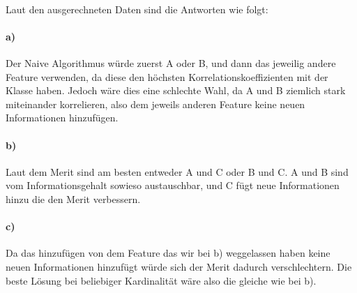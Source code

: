 \documentclass{article}
\begin{document}
\paragraph{}
Laut den ausgerechneten Daten sind die Antworten wie folgt: 
\paragraph{a)}
Der Naive Algorithmus würde zuerst A oder B, und dann das jeweilig andere Feature verwenden, da diese den höchsten Korrelationskoeffizienten mit der Klasse haben. Jedoch wäre dies eine schlechte Wahl, da A und B ziemlich stark miteinander korrelieren, also dem jeweils anderen Feature keine neuen Informationen hinzufügen.
\paragraph{b)}
Laut dem Merit sind am besten entweder A und C oder B und C. A und B sind vom Informationsgehalt sowieso austauschbar, und C fügt neue Informationen hinzu die den Merit verbessern.
\paragraph{c)}
Da das hinzufügen von dem Feature das wir bei b) weggelassen haben keine neuen Informationen hinzufügt würde sich der Merit dadurch verschlechtern. Die beste Lösung bei beliebiger Kardinalität wäre also die gleiche wie bei b).
\end{document}
